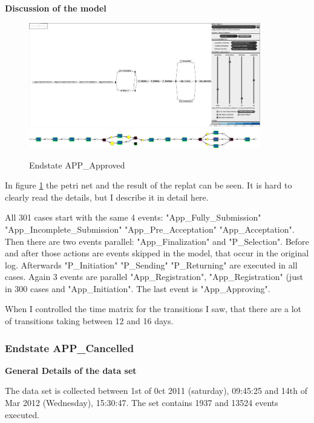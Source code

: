 \textbf{Discussion of the model}

\begin{figure}[!htbp]
\centering
\includegraphics[width =0.9\textwidth]{APP_ApprovedDFG0-3.PNG}  
\includegraphics[width =0.9\textwidth]{ApprovReplay.PNG}
\caption{Endstate APP\_Approved}
\label{fig:ApprovModel}
\end{figure}

In figure \ref{fig:ApprovModel} the petri net and the result of the replat can be seen. It is hard to clearly read the details, but I describe it in detail here. 

All 301 cases start with the same 4 events: "App\_Fully\_Submission" \textrightarrow "App\_Incomplete\_Submission" \textrightarrow "App\_Pre\_Acceptation" \textrightarrow "App\_Acceptation". Then there are two events parallel: "App\_Finalization" and "P\_Selection". Before and after those actions are events skipped in the model, that occur in the original log. Afterwards "P\_Initiation" \textrightarrow "P\_Sending" \textrightarrow "P\_Returning" are executed in all cases. Again 3 events are parallel "App\_Registration", "App\_Registration" (just in 300 cases and "App\_Initiation". The last event is "App\_Approving".

When I controlled the time matrix for the transitions I saw, that there are a lot of transitions taking between 12 and 16 days.

\subsubsection{Endstate APP\_Cancelled}


\textbf{General Details of the data set}

The data set is collected between 1st of 0ct 2011 (saturday), 09:45:25 and 14th of Mar 2012 (Wednesday), 15:30:47. The set contains 1937 and 13524 events executed. 

